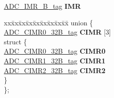 \begin{DoxyCompactItemize}
\begin{tabbing}
\end{tabbing}\item 
\mbox{\label{structADC__struct__tag_a6881282bed277604afe4778b8412818d}} 
\mbox{\hyperlink{unionADC__IMR__32B__tag}{A\+D\+C\+\_\+\+I\+M\+R\+\_\+B\+\_\+tag}} {\bfseries I\+MR}
\item 
\mbox{\label{structADC__struct__tag_afe19f82e13ec4830b056696c80649385}} 
\begin{tabbing}
xx\=xx\=xx\=xx\=xx\=xx\=xx\=xx\=xx\=\kill
union \{\\
\>\mbox{\hyperlink{unionADC__CIMR0__32B__tag}{ADC\_CIMR0\_32B\_tag}} {\bfseries CIMR} \mbox{[}3\mbox{]}\\
\mbox{\label{unionADC__struct__tag_1_1_0D1812_a3fe16e50c0e091d3ab7c13327c2c8c6c}} 
\>struct \{\\
\>\>\mbox{\hyperlink{unionADC__CIMR0__32B__tag}{ADC\_CIMR0\_32B\_tag}} {\bfseries CIMR0}\\
\>\>\mbox{\hyperlink{unionADC__CIMR1__32B__tag}{ADC\_CIMR1\_32B\_tag}} {\bfseries CIMR1}\\
\>\>\mbox{\hyperlink{unionADC__CIMR2__32B__tag}{ADC\_CIMR2\_32B\_tag}} {\bfseries CIMR2}\\
\>\} \\
\}; \\


\end{tabbing}
\end{DoxyCompactItemize}
